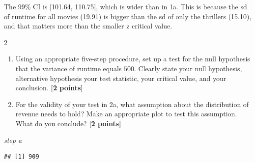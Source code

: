 \documentclass[
]{article}
\newenvironment{Shaded}{\begin{snugshade}}{\end{snugshade}}
\newcommand{\AttributeTok}[1]{\textcolor[rgb]{0.13,0.29,0.53}{#1}}
\newcommand{\CommentTok}[1]{\textcolor[rgb]{0.56,0.35,0.01}{\textit{#1}}}
\newcommand{\DecValTok}[1]{\textcolor[rgb]{0.00,0.00,0.81}{#1}}
\newcommand{\FloatTok}[1]{\textcolor[rgb]{0.00,0.00,0.81}{#1}}
\newcommand{\FunctionTok}[1]{\textcolor[rgb]{0.13,0.29,0.53}{\textbf{#1}}}
\newcommand{\NormalTok}[1]{#1}
\newcommand{\OtherTok}[1]{\textcolor[rgb]{0.56,0.35,0.01}{#1}}
\newcommand{\SpecialCharTok}[1]{\textcolor[rgb]{0.81,0.36,0.00}{\textbf{#1}}}
\providecommand{\tightlist}{%
  \setlength{\itemsep}{0pt}\setlength{\parskip}{0pt}}
\begin{document}
The 99\% CI is {[}101.64, 110.75{]}, which is wider than in 1a. This is
because the sd of runtime for all movies (19.91) is bigger than the sd
of only the thrillers (15.10), and that matters more than the smaller z
critical value.

2

\begin{enumerate}
\def\labelenumi{\alph{enumi}.}
\tightlist
\item
  Using an appropriate five-step procedure, set up a test for the null
  hypothesis that the variance of runtime equals \(500\). Clearly state
  your null hypothesis, alternative hypothesis your test statistic, your
  critical value, and your conclusion. \textbf{[2 points]}
\item
  For the validity of your test in 2a, what assumption about the
  distribution of revenue needs to hold? Make an appropriate plot to
  test this assumption. What do you conclude? \textbf{[2 points]}
\end{enumerate}

\emph{step a}

\begin{Shaded}
\end{Shaded}

\begin{verbatim}
## [1] 909
\end{verbatim}
\end{document}
